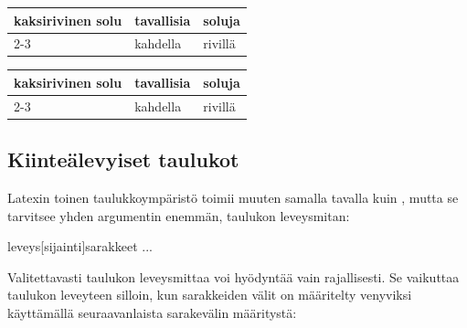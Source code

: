 \begin{esimerkki*}
  \komentoi{\keno}

\begin{koodilohko}
\begin{tabular}{|l|l|l|}
  \hline
  \multirow{2}{*}{kaksirivinen solu} & tavallisia & soluja \\
  \cline{2-3}
                                     & kahdella   & rivillä \\
  \hline
\end{tabular}
\end{koodilohko}

  \begin{tulos}
    \renewcommand{\arraystretch}{1.3}
    \begin{tabular}{|l|l|l|}
      \hline
      \multirow{2}{*}[-1bp]{kaksirivinen solu} & tavallisia & soluja \\
      \cline{2-3}
                                               & kahdella & rivillä \\
      \hline
    \end{tabular}
  \end{tulos}

  \caption{\-/ paketin \-/
    komennolla voi levittää yhden solun useamman rivin alueelle}
  \label{esim/taulukko-multirow}
\end{esimerkki*}

\subsection{Kiinteälevyiset taulukot}

Latexin toinen taulukkoympäristö  toimii muuten
samalla tavalla kuin , mutta se tarvitsee yhden
argumentin enemmän, taulukon leveysmitan:

\begin{koodilohkosis}
\begin{tabular*}{leveys}[sijainti]{sarakkeet}
  ...
\end{tabular*}
\end{koodilohkosis}

\noindent
Valitettavasti taulukon leveysmittaa voi hyödyntää vain rajallisesti. Se
vaikuttaa taulukon leveyteen silloin, kun sarakkeiden välit on
määritelty venyviksi käyttämällä seuraavanlaista sarakevälin määritystä:

